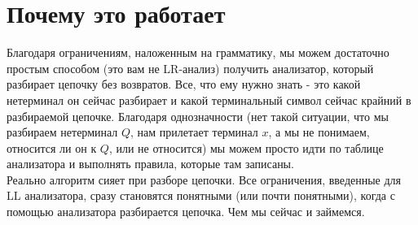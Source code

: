 \documentclass[14pt]{extreport}
\begin{document}
	\section{Почему это работает}
	Благодаря ограничениям, наложенным на грамматику, мы можем достаточно простым способом (это
	вам не LR-анализ) получить анализатор, который разбирает цепочку без возвратов. Все, что ему
	нужно знать - это какой нетерминал он сейчас разбирает и какой терминальный символ сейчас
	крайний в разбираемой цепочке. Благодаря однозначности (нет такой ситуации, что мы разбираем
	нетерминал $Q$, нам прилетает терминал $x$, а мы не понимаем, относится ли он к $Q$, или
	не относится) мы можем просто идти по таблице анализатора и выполнять правила, которые там
	записаны.\\
	Реально алгоритм сияет при разборе цепочки. Все ограничения, введенные для LL анализатора,
	сразу становятся понятными (или почти понятными), когда с помощью анализатора разбирается
	цепочка. Чем мы сейчас и займемся.
\end{document}
